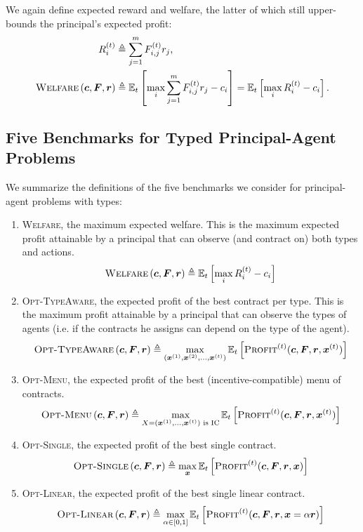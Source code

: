 \documentclass{article}
\newcommand{\E}{\mathbb{E}}
\newcommand{\costvector}{\bm{c}}
\newcommand{\Cost}[1]{c_{#1}}
\newcommand{\CostVector}{\bm{c}}
\newcommand{\TypedForecast}[3]{F^{(#1)}_{#2, #3}}
\newcommand{\ForecastTensor}{\bm{F}}
\newcommand{\rewardvector}{\bm{r}}
\newcommand{\Reward}[1]{r_{#1}}
\newcommand{\RewardVector}{\bm{r}}
\newcommand{\TypedExpectedReward}[2]{R^{(#1)}_{#2}}
\newcommand{\PrincipalAgentProblem}{\left(\costvector, \ForecastTensor, \rewardvector\right)}
\newcommand{\ContractVector}{\bm{x}}
\newcommand{\TypedContractVector}[1]{\bm{x}^{(#1)}}
\newcommand{\ContractMatrix}{X}
\newcommand{\TransferCoefficient}{\alpha}
\newcommand{\Profit}{\textsc{Profit}}
\newcommand{\TypedProfit}[1]{\Profit^{(#1)}}
\newcommand{\OWelfare}{\textsc{Welfare}}
\newcommand{\OTypeAware}{\textsc{Opt-TypeAware}}
\newcommand{\OMenu}{\textsc{Opt-Menu}}
\newcommand{\OSingle}{\textsc{Opt-Single}}
\newcommand{\OLinear}{\textsc{Opt-Linear}}
\begin{document}
We again define expected reward and welfare, the latter of which still upper-bounds the principal's expected profit:
\begin{align*}
  \TypedExpectedReward{t}{i} &\triangleq \sum_{j=1}^m \TypedForecast{t}{i}{j} \Reward{j}\text{,} \\
  \OWelfare \PrincipalAgentProblem
    &\triangleq \E_t \left[ \max_i \sum_{j=1}^m \TypedForecast{t}{i}{j} \Reward{j} - \Cost{i} \right]
    = \E_t \left[ \max_i \TypedExpectedReward{t}{i} - \Cost{i} \right]
    \text{.}
\end{align*}

\subsection{Five Benchmarks for Typed Principal-Agent Problems}

We summarize the definitions of the five benchmarks we consider for principal-agent problems with types:
\begin{enumerate}
  \item \OWelfare{}, the maximum expected welfare. This is the maximum expected profit attainable by a principal that can observe (and contract on) both types and actions.
  \[
    \OWelfare \PrincipalAgentProblem
      \triangleq \E_t \left[ \max_i \TypedExpectedReward{t}{i} - \Cost{i} \right]
  \]
  \item \OTypeAware{}, the expected profit of the best contract per type. This is the maximum profit attainable by a principal that can observe the types of agents (i.e. if the contracts he assigns can depend on the type of the agent).
  \[
    \OTypeAware \PrincipalAgentProblem
      \triangleq \max_{(\TypedContractVector{1}, \TypedContractVector{2}, \ldots, \TypedContractVector{t})}
        \E_t \left[ \TypedProfit{t}(\CostVector, \ForecastTensor, \RewardVector, \TypedContractVector{t}) \right]
  \]
  \item \OMenu{}, the expected profit of the best (incentive-compatible) menu of contracts.
  \[
    \OMenu \PrincipalAgentProblem
      \triangleq \max_{\ContractMatrix = (\TypedContractVector{1}, \ldots, \TypedContractVector{t}) \text{ is IC}}
        \E_t \left[ \TypedProfit{t}(\CostVector, \ForecastTensor, \RewardVector, \TypedContractVector{t}) \right]
  \]
  \item \OSingle{}, the expected profit of the best single contract.
  \[
    \OSingle \PrincipalAgentProblem
      \triangleq \max_{\ContractVector}
        \E_t \left[ \TypedProfit{t}(\CostVector, \ForecastTensor, \RewardVector, \ContractVector) \right]
  \]
  \item \OLinear{}, the expected profit of the best single linear contract.
  \[
    \OLinear \PrincipalAgentProblem
      \triangleq \max_{\TransferCoefficient \in [0, 1]}
        \E_t \left[ \TypedProfit{t}(\CostVector, \ForecastTensor, \RewardVector, \ContractVector = \TransferCoefficient \RewardVector) \right]
  \]
\end{enumerate}
\end{document}
